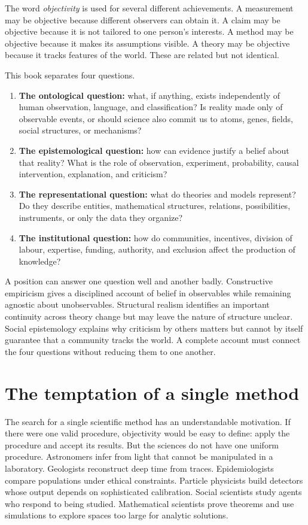 The word \emph{objectivity} is used for several different
achievements. A measurement may be objective because different observers can
obtain it. A claim may be objective because it is not tailored to one person's
interests. A method may be objective because it makes its assumptions visible.
A theory may be objective because it tracks features of the world. These are
related but not identical.

This book separates four questions.

\begin{enumerate}[label=\textbf{\arabic*.}]
\item \textbf{The ontological question:} what, if anything, exists independently
of human observation, language, and classification? Is reality made only of
observable events, or should science also commit us to atoms, genes, fields,
social structures, or mechanisms?
\item \textbf{The epistemological question:} how can evidence justify a belief
about that reality? What is the role of observation, experiment, probability,
causal intervention, explanation, and criticism?
\item \textbf{The representational question:} what do theories and models
represent? Do they describe entities, mathematical structures, relations,
possibilities, instruments, or only the data they organize?
\item \textbf{The institutional question:} how do communities, incentives,
division of labour, expertise, funding, authority, and exclusion affect the
production of knowledge?
\end{enumerate}

A position can answer one question well and another badly. Constructive
empiricism gives a disciplined account of belief in observables while remaining
agnostic about unobservables. Structural realism identifies an important
continuity across theory change but may leave the nature of structure unclear.
Social epistemology explains why criticism by others matters but cannot by
itself guarantee that a community tracks the world. A complete account must
connect the four questions without reducing them to one another.

\section{The temptation of a single method}

The search for a single scientific method has an understandable motivation.
If there were one valid procedure, objectivity would be easy to define:
apply the procedure and accept its results. But the sciences do not have one
uniform procedure. Astronomers infer from light that cannot be manipulated in a
laboratory. Geologists reconstruct deep time from traces. Epidemiologists
compare populations under ethical constraints. Particle physicists build
detectors whose output depends on sophisticated calibration. Social scientists
study agents who respond to being studied. Mathematical scientists prove
theorems and use simulations to explore spaces too large for analytic
solutions.

